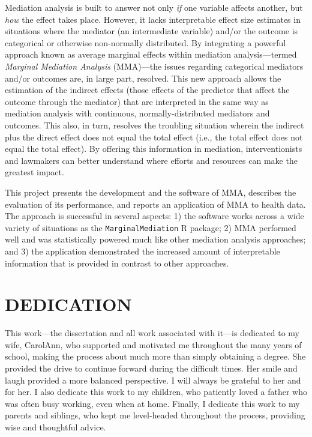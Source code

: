 \documentclass[]{DissertateUSU}
\begin{document}
Mediation analysis is built to answer not only \emph{if} one variable
affects another, but \emph{how} the effect takes place. However, it
lacks interpretable effect size estimates in situations where the
mediator (an intermediate variable) and/or the outcome is categorical or
otherwise non-normally distributed. By integrating a powerful approach
known as average marginal effects within mediation analysis---termed
\emph{Marginal Mediation Analysis} (MMA)---the issues regarding
categorical mediators and/or outcomes are, in large part, resolved. This
new approach allows the estimation of the indirect effects (those
effects of the predictor that affect the outcome through the mediator)
that are interpreted in the same way as mediation analysis with
continuous, normally-distributed mediators and outcomes. This also, in
turn, resolves the troubling situation wherein the indirect plus the
direct effect does not equal the total effect (i.e., the total effect
does not equal the total effect). By offering this information in
mediation, interventionists and lawmakers can better understand where
efforts and resources can make the greatest impact.

This project presents the development and the software of MMA, describes
the evaluation of its performance, and reports an application of MMA to
health data. The approach is successful in several aspects: 1) the
software works across a wide variety of situations as the
\texttt{MarginalMediation} R package; 2) MMA performed well and was
statistically powered much like other mediation analysis approaches; and
3) the application demonstrated the increased amount of interpretable
information that is provided in contrast to other approaches.

\singlespacing

\newpage

 \fancyhead[R]{\thepage} \fancyfoot[C]{}
\chapter*{DEDICATION} 

This work---the dissertation and all work associated with it---is
dedicated to my wife, CarolAnn, who supported and motivated me
throughout the many years of school, making the process about much more
than simply obtaining a degree. She provided the drive to continue
forward during the difficult times. Her smile and laugh provided a more
balanced perspective. I will always be grateful to her and for her. I
also dedicate this work to my children, who patiently loved a father who
was often busy working, even when at home. Finally, I dedicate this work
to my parents and siblings, who kept me level-headed throughout the
process, providing wise and thoughtful advice.
\end{document}
